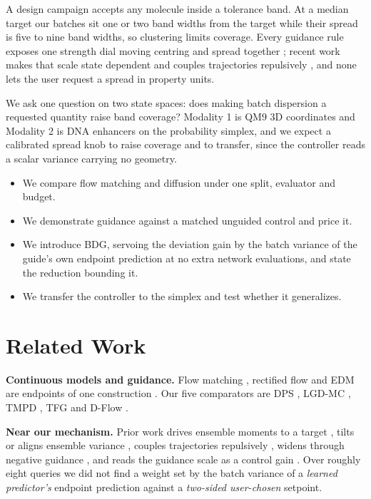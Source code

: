 A design campaign accepts any molecule inside a tolerance band. At a median target our
batches sit one or two band widths from the target while their spread is five to nine
band widths, so clustering limits coverage. Every guidance rule exposes one strength
dial moving centring and spread together \citep{ho2022classifier,zheng2023guided};
recent work makes that scale state dependent \citep{fbg2025feedback,cfgctrl2026} and
couples trajectories repulsively \citep{corso2024particle}, and none lets the user
request a spread in property units.

We ask one question on two state spaces: does making batch dispersion a requested
quantity raise band coverage? Modality 1 is QM9 3D coordinates and Modality 2 is DNA
enhancers on the probability simplex, and we expect a calibrated spread knob to raise
coverage and to transfer, since the controller reads a scalar variance carrying no
geometry.
\begin{itemize}[leftmargin=1.1em,itemsep=0pt,topsep=1pt,parsep=0pt]
  \item We compare flow matching and diffusion under one split, evaluator and budget.
  \item We demonstrate guidance against a matched unguided control and price it.
  \item We introduce BDG, servoing the deviation gain by the batch variance of the
    guide's own endpoint prediction at no extra network evaluations, and state the
    reduction bounding it.
  \item We transfer the controller to the simplex and test whether it generalizes.
\end{itemize}

\section{Related Work}

\textbf{Continuous models and guidance.} Flow matching \citep{lipman2022flow},
rectified flow \citep{liu2022flow} and EDM \citep{karras2022elucidating} are endpoints
of one construction \citep{albergo2025stochastic,ma2024sit}. Our five comparators are
DPS \citep{chung2023dps}, LGD-MC \citep{song2023lgd}, TMPD \citep{boys2024tmpd}, TFG
\citep{ye2024tfg} and D-Flow \citep{benhamu2024dflow}.

\textbf{Near our mechanism.} Prior work drives ensemble moments to a target
\citep{mgd2026moment}, tilts or aligns ensemble variance
\citep{vtd2026variance,ensemblevar2025}, couples trajectories
repulsively \citep{corso2024particle}, widens through negative guidance
\citep{ventura2026negative}, and reads the guidance scale as a control gain
\citep{cfgctrl2026,fbg2025feedback}. Over roughly eight queries we did not find a
weight set by the batch variance of a \emph{learned predictor's} endpoint prediction
against a \emph{two-sided user-chosen} setpoint.

